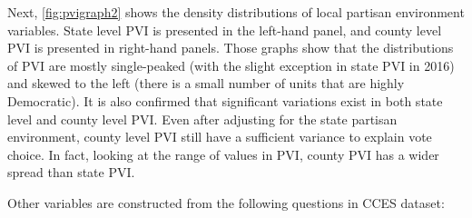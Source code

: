 \par Next, \autoref{fig:pvigraph2} shows the density distributions of local partisan environment variables. State level PVI is presented in the left-hand panel, and county level PVI is presented in right-hand panels. Those graphs show that the distributions of PVI are mostly single-peaked (with the slight exception in state PVI in 2016) and skewed to the left (there is a small number of units that are highly Democratic). It is also confirmed that significant variations exist in both state level and county level PVI. Even after adjusting for the state partisan environment, county level PVI still have a sufficient variance to explain vote choice. In fact, looking at the range of values in PVI, county PVI has a wider spread than state PVI.

\par Other variables are constructed from the following questions in CCES dataset:

